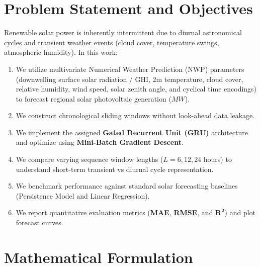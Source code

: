 \documentclass[12pt,a4paper]{article}
\begin{document}
\section*{Problem Statement and Objectives}
Renewable solar power is inherently intermittent due to diurnal astronomical cycles and transient weather events (cloud cover, temperature swings, atmospheric humidity). In this work:
\begin{enumerate}
    \item We utilize multivariate Numerical Weather Prediction (NWP) parameters (downwelling surface solar radiation / GHI, 2m temperature, cloud cover, relative humidity, wind speed, solar zenith angle, and cyclical time encodings) to forecast regional solar photovoltaic generation ($MW$).
    \item We construct chronological sliding windows without look-ahead data leakage.
    \item We implement the assigned \textbf{Gated Recurrent Unit (GRU)} architecture and optimize using \textbf{Mini-Batch Gradient Descent}.
    \item We compare varying sequence window lengths ($L=6, 12, 24$ hours) to understand short-term transient vs diurnal cycle representation.
    \item We benchmark performance against standard solar forecasting baselines (Persistence Model and Linear Regression).
    \item We report quantitative evaluation metrics (\textbf{MAE}, \textbf{RMSE}, and $\mathbf{R^2}$) and plot forecast curves.
\end{enumerate}

\section*{Mathematical Formulation}
\end{document}
